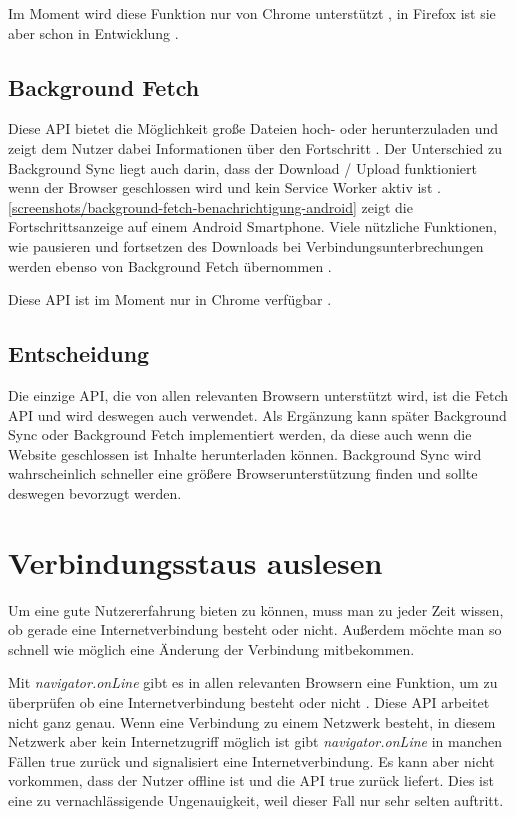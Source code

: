 Im Moment wird diese Funktion nur von Chrome unterstützt \autocite{caniuse-background-sync}, in Firefox ist sie aber schon in Entwicklung \autocite{status-mozilla-background-sync}.

\subsection{Background Fetch}
Diese \ac{API} bietet die Möglichkeit große Dateien hoch- oder herunterzuladen und zeigt dem Nutzer dabei Informationen über den Fortschritt \autocite{google-background-fetch}. Der Unterschied zu Background Sync liegt auch darin, dass der Download / Upload funktioniert wenn der Browser geschlossen wird und kein Service Worker aktiv ist \autocite{google-background-fetch}. \autoref{screenshots/background-fetch-benachrichtigung-android} zeigt die Fortschrittsanzeige auf einem Android Smartphone. Viele nützliche Funktionen, wie pausieren und fortsetzen des Downloads bei Verbindungsunterbrechungen werden ebenso von Background Fetch übernommen \autocite{google-background-fetch}. 


Diese \ac{API} ist im Moment nur in Chrome verfügbar \autocite{google-background-fetch}.

\subsection{Entscheidung}
Die einzige \ac{API}, die von allen relevanten Browsern unterstützt wird, ist die Fetch \ac{API} und wird deswegen auch verwendet. Als Ergänzung kann später Background Sync oder Background Fetch implementiert werden, da diese auch wenn die Website geschlossen ist Inhalte herunterladen können. Background Sync wird wahrscheinlich schneller eine größere Browserunterstützung finden und sollte deswegen bevorzugt werden.

\section{Verbindungsstaus auslesen}
Um eine gute Nutzererfahrung bieten zu können, muss man zu jeder Zeit wissen, ob gerade eine Internetverbindung besteht oder nicht. Außerdem möchte man so schnell wie möglich eine Änderung der Verbindung mitbekommen.

Mit \emph{navigator.onLine} gibt es in allen relevanten Browsern \autocite{caniuse-online} eine Funktion, um zu überprüfen ob eine Internetverbindung besteht oder nicht \autocite{Sheppard2017} \autocite{mdn-online}. Diese \ac{API} arbeitet nicht ganz genau. Wenn eine Verbindung zu einem Netzwerk besteht, in diesem Netzwerk aber kein Internetzugriff möglich ist gibt \emph{navigator.onLine} in manchen Fällen true zurück und signalisiert eine Internetverbindung\autocite{Sheppard2017}. Es kann aber nicht vorkommen, dass der Nutzer offline ist und die \ac{API} true zurück liefert. Dies ist eine zu vernachlässigende Ungenauigkeit, weil dieser Fall nur sehr selten auftritt. 

